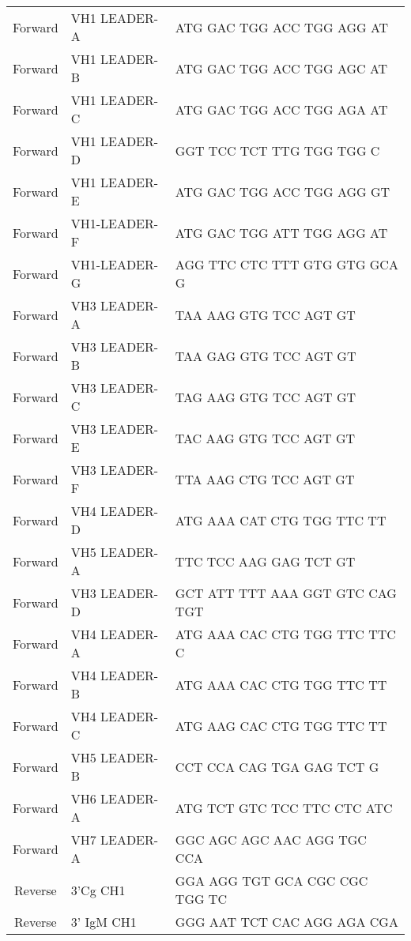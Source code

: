 \documentclass{article}%
\begin{document}
\begin{longtable}{cll}
\bottomrule
\endlastfoot
Forward   &  VH1 LEADER-A &       ATG GAC TGG ACC TGG AGG AT \\
Forward   &  VH1 LEADER-B &       ATG GAC TGG ACC TGG AGC AT \\
Forward   &  VH1 LEADER-C &       ATG GAC TGG ACC TGG AGA AT \\
Forward   &  VH1 LEADER-D &        GGT TCC TCT TTG TGG TGG C \\
Forward   &  VH1 LEADER-E &       ATG GAC TGG ACC TGG AGG GT \\
Forward   &  VH1-LEADER-F &       ATG GAC TGG ATT TGG AGG AT \\
Forward   &  VH1-LEADER-G &    AGG TTC CTC TTT GTG GTG GCA G \\
Forward   &  VH3 LEADER-A &           TAA AAG GTG TCC AGT GT \\
Forward   &  VH3 LEADER-B &           TAA GAG GTG TCC AGT GT \\
Forward   &  VH3 LEADER-C &           TAG AAG GTG TCC AGT GT \\
Forward   &  VH3 LEADER-E &           TAC AAG GTG TCC AGT GT \\
Forward   &  VH3 LEADER-F &           TTA AAG CTG TCC AGT GT \\
Forward   &  VH4 LEADER-D &       ATG AAA CAT CTG TGG TTC TT \\
Forward   &  VH5 LEADER-A &           TTC TCC AAG GAG TCT GT \\
Forward   &  VH3 LEADER-D &  GCT ATT TTT AAA GGT GTC CAG TGT \\
Forward   &  VH4 LEADER-A &    ATG AAA CAC CTG TGG TTC TTC C \\
Forward   &  VH4 LEADER-B &       ATG AAA CAC CTG TGG TTC TT \\
Forward   &  VH4 LEADER-C &       ATG AAG CAC CTG TGG TTC TT \\
Forward   &  VH5 LEADER-B &        CCT CCA CAG TGA GAG TCT G \\
Forward   &  VH6 LEADER-A &      ATG TCT GTC TCC TTC CTC ATC \\
Forward   &  VH7 LEADER-A &      GGC AGC AGC AAC AGG TGC CCA \\
Reverse   &      3'Cg CH1 &   GGA AGG TGT GCA CGC CGC TGG TC \\
Reverse   &    3' IgM CH1 &      GGG AAT TCT CAC AGG AGA CGA \\
\end{longtable}
%
%
\end{document}
